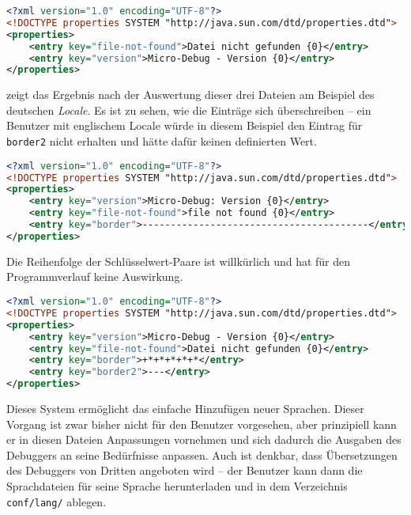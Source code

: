 \begin{lstlisting}[language=XML,caption={Beispiel für Datei \texttt{text_de.xml}},label=\lstlbl{locale-file-de}]
<?xml version="1.0" encoding="UTF-8"?>
<!DOCTYPE properties SYSTEM "http://java.sun.com/dtd/properties.dtd">
<properties>
	<entry key="file-not-found">Datei nicht gefunden {0}</entry>
	<entry key="version">Micro-Debug - Version {0}</entry>
</properties>
\end{lstlisting}

 zeigt das Ergebnis nach der Auswertung dieser drei Dateien am Beispiel des deutschen \emph{Locale}. Es ist zu sehen, wie die Einträge sich überschreiben -- ein Benutzer mit englischem Locale würde in diesem Beispiel den Eintrag für \texttt{border2} nicht erhalten und hätte dafür keinen definierten Wert.

\begin{lstlisting}[language=XML,caption={Beispiel für Datei \texttt{text.xml}},label=\lstlbl{locale-file}]
<?xml version="1.0" encoding="UTF-8"?>
<!DOCTYPE properties SYSTEM "http://java.sun.com/dtd/properties.dtd">
<properties>
	<entry key="version">Micro-Debug: Version {0}</entry>
	<entry key="file-not-found">file not found {0}</entry>
	<entry key="border">----------------------------------------</entry>
</properties>
\end{lstlisting}

Die Reihenfolge der Schlüsselwert-Paare ist willkürlich und hat für den Programmverlauf keine Auswirkung.

\begin{lstlisting}[language=XML,caption={Beispiel für Ergebnis nach Verarbeitung der Lokalisierungsdateien},label=\lstlbl{locale-result}]
<?xml version="1.0" encoding="UTF-8"?>
<!DOCTYPE properties SYSTEM "http://java.sun.com/dtd/properties.dtd">
<properties>
	<entry key="version">Micro-Debug - Version {0}</entry>
	<entry key="file-not-found">Datei nicht gefunden {0}</entry>
	<entry key="border">+*+*+*+*+*</entry>
	<entry key="border2">---</entry>
</properties>
\end{lstlisting}

Dieses System ermöglicht das einfache Hinzufügen neuer Sprachen. Dieser Vorgang ist zwar bisher nicht für den Benutzer vorgesehen, aber prinzipiell kann er in diesen Dateien Anpassungen vornehmen und sich dadurch die Ausgaben des Debuggers an seine Bedürfnisse anpassen. Auch ist denkbar, dass Übersetzungen des Debuggers von Dritten angeboten wird -- der Benutzer kann dann die Sprachdateien für seine Sprache herunterladen und in dem Verzeichnis \texttt{conf/lang/} ablegen.

